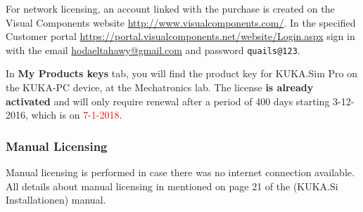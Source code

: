 For network licensing, an account linked with the purchase is created on the Visual Components website \url{http://www.visualcomponents.com/}. In the specified Customer portal \url{https://portal.visualcomponents.net/website/Login.aspx} sign in with the email \url{hodaeltahawy@gmail.com} and password \texttt{quails@123}.

In \textbf{My Products keys} tab, you will find the product key for KUKA.Sim Pro on the KUKA-PC device, at the Mechatronics lab. The license \textbf {is already activated} and will only require renewal after a period of 400 days starting 3-12-2016, which is on \textcolor{red}{7-1-2018}. 

\subsubsection{Manual Licensing}
Manual licensing is performed in case there was no internet connection available. All details about manual licensing in mentioned on page 21 of the (KUKA.Si
\textunderscore Installation\textunderscore en) manual. 

